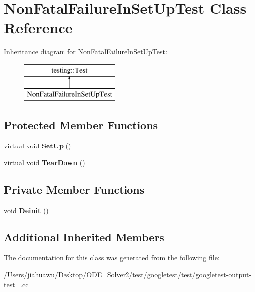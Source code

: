 \hypertarget{class_non_fatal_failure_in_set_up_test}{}\section{Non\+Fatal\+Failure\+In\+Set\+Up\+Test Class Reference}
\label{class_non_fatal_failure_in_set_up_test}
Inheritance diagram for Non\+Fatal\+Failure\+In\+Set\+Up\+Test\+:\begin{figure}[H]
\begin{center}
\leavevmode
\includegraphics[height=2.000000cm]{class_non_fatal_failure_in_set_up_test}
\end{center}
\end{figure}
\subsection*{Protected Member Functions}
\begin{DoxyCompactItemize}
\item 
\mbox{\label{class_non_fatal_failure_in_set_up_test_ae24c724bae1fcd2601f58fa9c26adca3}} 
virtual void {\bfseries Set\+Up} ()
\item 
\mbox{\label{class_non_fatal_failure_in_set_up_test_a36abc808b11afc6a9bfa20dac5c28c30}} 
virtual void {\bfseries Tear\+Down} ()
\end{DoxyCompactItemize}
\subsection*{Private Member Functions}
\begin{DoxyCompactItemize}
\item 
\mbox{\label{class_non_fatal_failure_in_set_up_test_a86ecc924c67807b75e5ef5e89d8277ce}} 
void {\bfseries Deinit} ()
\end{DoxyCompactItemize}
\subsection*{Additional Inherited Members}


The documentation for this class was generated from the following file\+:\begin{DoxyCompactItemize}
\item 
/\+Users/jiahuawu/\+Desktop/\+O\+D\+E\+\_\+\+Solver2/test/googletest/test/googletest-\/output-\/test\+\_\+.\+cc\end{DoxyCompactItemize}
